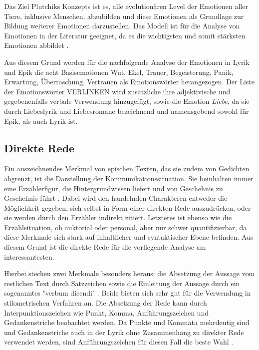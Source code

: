 \documentclass[a4paper,10p]{article}
\begin{document}
Das Ziel Plutchiks Konzepts ist es, alle evolutionären Level der Emotionen aller Tiere, inklusive Menschen, abzubilden und diese Emotionen als Grundlage zur Bildung weiterer Emotionen darzustellen. Das Modell ist für die Analyse von Emotionen in der Literatur geeignet, da es die wichtigsten und somit stärksten Emotionen abbildet \citep[vgl.][S. 40-122]{Plutchik}. \par 

Aus diesem Grund werden für die nachfolgende Analyse der Emotionen in Lyrik und Epik die acht Basisemotionen Wut, Ekel, Trauer, Begeisterung, Panik, Erwartung, Überraschung, Vertrauen als Emotionswörter herangezogen. Der Liste der Emotionswörter VERLINKEN wird zusätzliche ihre adjektivische und gegebenenfalls verbale Verwendung hinzugefügt, sowie die Emotion \textit{Liebe}, da sie durch Liebeslyrik und Liebesromane bezeichnend und namensgebend sowohl für Epik, als auch Lyrik ist. 
 

\subsection{Direkte Rede}
 Ein auszeichnendes Merkmal von epischen Texten, das sie zudem von Gedichten abgrenzt, ist die Darstellung der Kommunikationssituation. Sie beinhalten immer eine Erzählerfigur, die Hintergrundwissen liefert und von Geschehnis zu Geschehnis führt \citep[vgl.][S. 9]{Bloß2005}. Dabei wird den handelnden Charakteren entweder die Möglichkeit gegeben, sich selbst in Form einer direkten Rede auszudrücken, oder sie werden durch den Erzähler indirekt zitiert. Letzteres ist ebenso wie die Erzählsituation, ob auktorial oder personal, aber nur schwer quantifizierbar, da diese Merkmale sich stark auf inhaltlicher und syntaktischer Ebene befinden. Aus diesem Grund ist die direkte Rede für die vorliegende Analyse am interessantesten.\par 

Hierbei stechen zwei Merkmale besonders heraus: die Absetzung der Aussage vom restlichen Text durch Satzzeichen sowie die Einleitung der Aussage durch ein sogenanntes "verbum dicendi" \citep[S. 6]{Bloß2005}. Beide bieten sich sehr gut für die Verwendung in stilometrischen Verfahren an. Die Absetzung der Rede kann durch Interpunktionszeichen wie Punkt, Komma, Anführungszeichen und Gedankenstriche beobachtet werden. Da Punkte und Kommata mehrdeutig sind und Gedankenstriche auch in der Lyrik ohne Zusammenhang zu direkter Rede verwendet werden, sind Anführungszeichen für diesen Fall die beste Wahl \citep[vgl.][S. 34]{Bloß2005}.\par 
\end{document}
